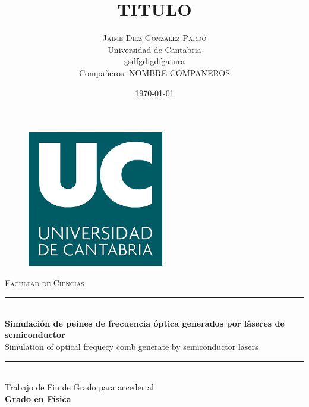 \documentclass[a4paper, 11pt, oneside]{book}
\title{
		\selectfont\textbf{TITULO}%
	}
\author{
		\textsc{Jaime Diez Gonzalez-Pardo}\\
		\fontsize{28pt}{10pt} Universidad de Cantabria \\ %
		\normalsize gsdfgdfgdfgatura \\ 
		\normalsize{Compañeros:} \textsc{NOMBRE COMPANEROS }\\
	}
\date{\today}
\begin{document}
		\begin{titlepage} 

			\newcommand{\HRule}{\rule{\linewidth}{0.5mm}} 
			
			\center %
			
			
				
					\begin{figure}[H]
						\centering
						\includegraphics[scale=0.6]{download.png}
					\end{figure}

					\textsc{\LARGE Facultad de Ciencias}\\[1.5cm] 
			
			
			
				\HRule\\[0.4cm]
				
				{\huge\bfseries Simulación de peines de frecuencia óptica generados por láseres de semiconductor}\\[0.8cm] %

				{\huge Simulation of optical frequecy comb generate by semiconductor lasers}\\[0.4cm] %
				
				\HRule\\[1.5cm]

				{\Large Trabajo de Fin de Grado para acceder al}\\[0.4cm]

				{\LARGE\bfseries Grado en Física}\\[3cm]
			

\end{titlepage}
\end{document}
